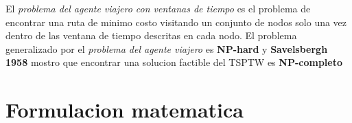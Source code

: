 \documentclass[journal, a4paper]{IEEEtran}
\begin{document}
El \textit{ problema del agente viajero con ventanas de tiempo } es el problema de encontrar
una ruta de minimo costo visitando un conjunto de nodos solo una vez dentro de las 
ventana de tiempo descritas en cada nodo. El problema generalizado por el \textit{problema
del agente viajero} \cite{tspdef} es \textbf{NP-hard} y \textbf{Savelsbergh 1958} \cite{HOP90} 
mostro que encontrar una solucion factible del TSPTW es \textbf{NP-completo} 

\section{Formulacion matematica}
\end{document}
